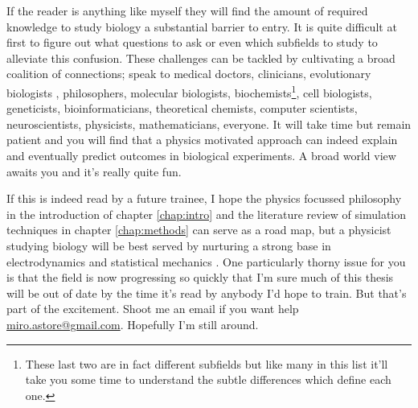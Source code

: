 If the reader is anything like myself they will find the amount of required knowledge to study biology a substantial barrier to entry. It is quite difficult at first to figure out what questions to ask or even which subfields to study to alleviate this confusion. These challenges can be tackled by cultivating a broad coalition of connections; speak to medical doctors, clinicians, evolutionary biologists \cite{dawkins1989, dawkins2016}, philosophers, molecular biologists, biochemists\footnote{These last two are in fact different subfields but like many in this list it'll take you some time to understand the subtle differences which define each one.}, cell biologists\cite{pollard2016}, geneticists, bioinformaticians, theoretical chemists, computer scientists, neuroscientists, physicists, mathematicians, everyone. It will take time but remain patient and you will find that a physics motivated approach can indeed explain and eventually predict outcomes in biological experiments. A broad world view awaits you and it's really quite fun. 

If this is indeed read by a future trainee, I hope the physics focussed philosophy in the introduction of chapter \ref{chap:intro} and the literature review of simulation techniques in chapter \ref{chap:methods} can serve as a road map, but a physicist studying biology will be best served by nurturing a strong base in electrodynamics and statistical mechanics \cite{griffiths2017, reif2009, zuckerman2010}. One particularly thorny issue for you is that the field is now progressing so quickly that I'm sure much of this thesis will be out of date by the time it's read by anybody I'd hope to train. But that's part of the excitement. Shoot me an email if you want help \href{mailto:miro.astore@gmailcom}{miro.astore@gmail.com}. Hopefully I'm still around.

